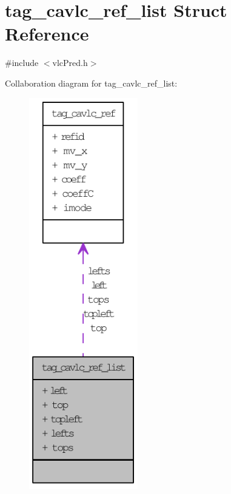 \hypertarget{structtag__cavlc__ref__list}{
\section{tag\_\-cavlc\_\-ref\_\-list Struct Reference}
\label{structtag__cavlc__ref__list}
}


{\ttfamily \#include $<$vlcPred.h$>$}



Collaboration diagram for tag\_\-cavlc\_\-ref\_\-list:\nopagebreak
\begin{figure}[H]
\begin{center}
\leavevmode
\includegraphics[width=134pt]{structtag__cavlc__ref__list__coll__graph}
\end{center}
\end{figure}
